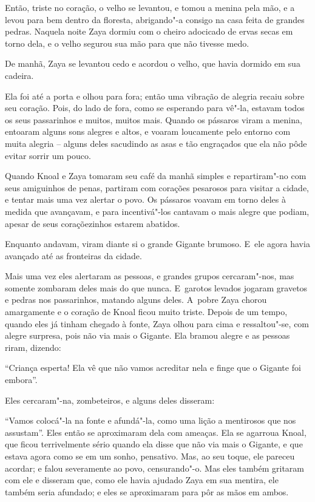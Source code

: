 Então, triste no coração, o velho se levantou, e tomou a menina pela
mão, e a levou para bem dentro da floresta, abrigando"-a consigo na casa
feita de grandes pedras. Naquela noite Zaya dormiu com o cheiro
adocicado de ervas secas em torno dela, e o velho segurou sua mão para
que não tivesse medo.

De manhã, Zaya se levantou cedo e acordou o velho, que havia dormido em
sua cadeira.

Ela foi até a porta e olhou para fora; então uma vibração de alegria
recaiu sobre seu coração. Pois, do lado de fora, como se esperando para
vê"-la, estavam todos os seus passarinhos e muitos, muitos mais. Quando
os pássaros viram a menina, entoaram alguns sons alegres e altos, e
voaram loucamente pelo entorno com muita alegria -- alguns deles
sacudindo as asas e tão engraçados que ela não pôde evitar sorrir um
pouco.

Quando Knoal e Zaya tomaram seu café da manhã simples e repartiram"-no
com seus amiguinhos de penas, partiram com corações pesarosos para
visitar a cidade, e tentar mais uma vez alertar o povo. Os pássaros
voavam em torno deles à medida que avançavam, e para incentivá"-los
cantavam o mais alegre que podiam, apesar de seus coraçõezinhos estarem
abatidos.

Enquanto andavam, viram diante si o grande Gigante brumoso. E~ele agora
havia avançado até as fronteiras da cidade.

Mais uma vez eles alertaram as pessoas, e grandes grupos cercaram"-nos,
mas somente zombaram deles mais do que nunca. E~garotos levados jogaram
gravetos e pedras nos passarinhos, matando alguns deles. A~pobre Zaya
chorou amargamente e o coração de Knoal ficou muito triste. Depois de um
tempo, quando eles já tinham chegado à fonte, Zaya olhou para cima e
ressaltou"-se, com alegre surpresa, pois não via mais o Gigante. Ela
bramou alegre e as pessoas riram, dizendo:

``Criança esperta! Ela vê que não vamos acreditar nela e finge que o
Gigante foi embora''.

Eles cercaram"-na, zombeteiros, e alguns deles disseram:

``Vamos colocá"-la na fonte e afundá"-la, como uma lição a mentirosos que
nos assustam''. Eles então se aproximaram dela com ameaças. Ela se
agarroua Knoal, que ficou terrivelmente sério quando ela disse que não
via mais o Gigante, e que estava agora como se em um sonho, pensativo.
Mas, ao seu toque, ele pareceu acordar; e falou severamente ao povo,
censurando"-o. Mas eles também gritaram com ele e disseram que, como ele
havia ajudado Zaya em sua mentira, ele também seria afundado; e eles se
aproximaram para pôr as mãos em ambos.


